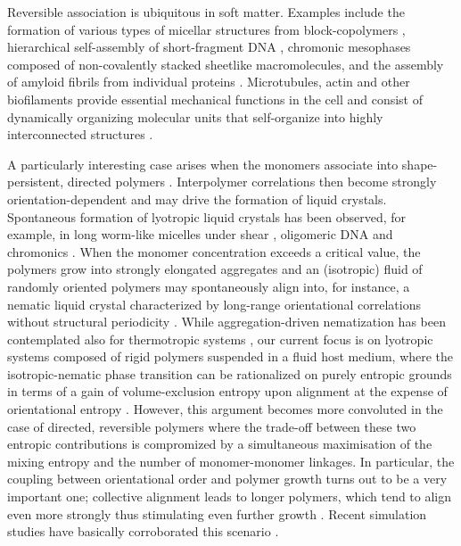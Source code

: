   Reversible association is ubiquitous in soft matter. Examples include the formation of various types of micellar structures from block-copolymers \cite{riess2003,blanazs2009}, hierarchical self-assembly of  short-fragment DNA  \cite{demichele2012,demichele2016}, chromonic mesophases  \cite{lydon2010,tamchang2008}  composed of non-covalently stacked sheetlike macromolecules, and the assembly of amyloid fibrils from individual proteins \cite{knowles2011}. Microtubules, actin and other biofilaments provide essential mechanical functions in the cell and consist of dynamically organizing molecular units that self-organize into highly interconnected structures \cite{fuchs1998}.
 
 
 
A particularly interesting case arises when the monomers associate into shape-persistent, directed polymers \cite{gittes1993}. Interpolymer correlations then become strongly orientation-dependent and may drive the formation of liquid crystals.  Spontaneous  formation of lyotropic liquid crystals has been observed, for example, in long worm-like micelles under shear  \cite{berret1994}, oligomeric DNA \cite{nakata2007} and chromonics \cite{lydon2010}. When the monomer concentration exceeds a critical value, the polymers grow into strongly elongated aggregates  and an (isotropic) fluid of randomly oriented polymers may spontaneously align into, for instance, a nematic liquid crystal characterized by long-range orientational correlations without structural periodicity \cite{gennes-prost}.  While aggregation-driven nematization has been contemplated also for thermotropic systems  \cite{matsuyama1998}, our current focus  is  on lyotropic systems composed of rigid polymers suspended in a fluid host medium, where the isotropic-nematic phase transition can be rationalized on purely entropic grounds in terms of a gain of volume-exclusion entropy upon alignment at the expense of orientational entropy \cite{Onsager, odijkoverview,Vroege92}. However, this argument becomes more convoluted in the case  of directed, reversible polymers where the trade-off between these two entropic contributions is compromized by a simultaneous maximisation of the mixing entropy and the number of monomer-monomer linkages. In particular, the  coupling between orientational order and polymer growth turns out to be a very important one; collective alignment leads to longer polymers, which tend to align even more strongly thus stimulating even further growth \cite{vdschoot1994la}.  Recent simulation studies have basically corroborated this scenario \cite{kindt2001,kuriabova2010,nguyen2014}.  

